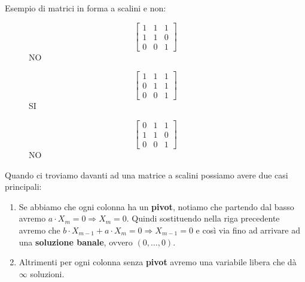\begin{example}
Esempio di matrici in forma a scalini e non:
\vspace{-10pt}
\begin{figure}[h!]
    \centering
    \begin{minipage}{.3\linewidth}
        \centering
        \[
            \begin{bmatrix}
            1 & 1 & 1\\
            1 & 1 & 0\\
            0 & 0 & 1
            \end{bmatrix}
        \]
        NO
    \end{minipage}
    \begin{minipage}{.3\linewidth}
        \centering
        \[
            \begin{bmatrix}
            1 & 1 & 1\\
            0 & 1 & 1\\
            0 & 0 & 1
            \end{bmatrix}
        \]
        SI
    \end{minipage}
    \begin{minipage}{.3\linewidth}
        \centering
        \[
            \begin{bmatrix}
            0 & 1 & 1\\
            1 & 1 & 0\\
            0 & 0 & 1
            \end{bmatrix}
        \]
        NO
     \end{minipage}
\end{figure}
\end{example}

\begin{observation}
	Quando ci troviamo davanti ad una matrice a scalini possiamo avere due casi principali:
	\begin{enumerate}
		\item Se abbiamo che ogni colonna ha un \textbf{pivot}, notiamo che partendo dal basso avremo $a \cdot X_m = 0 \Rightarrow X_m = 0$. Quindi sostituendo nella riga precedente avremo che $b \cdot X_{m-1} + a \cdot X_m = 0 \Rightarrow X_{m-1} = 0$ e così via fino ad arrivare ad una \textbf{soluzione banale}, ovvero $(0, \ldots, 0)$.
		\item Altrimenti per ogni colonna senza \textbf{pivot} avremo una variabile libera che dà $\infty$ soluzioni.
	\end{enumerate}
\end{observation}

